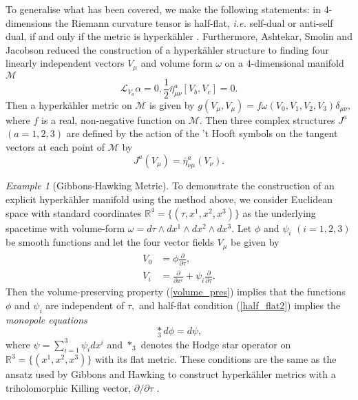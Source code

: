 \documentclass[a4paper,onecolumn,12pt]{article}
\theoremstyle{definition}
\theoremstyle{remark}
\newtheorem{ex}[thm]{Example}
\newcommand{\ie}{\emph{i.e.} }
\newcommand{\al}{\alpha}
\newcommand{\w}{\omega}
\newcommand{\m}{\mu}
\newcommand{\n}{\nu}
\newcommand{\ddt}[1]{\frac{\partial #1}{\partial \tau}}
\newcommand{\dd}[2]{\frac{\partial #1}{\partial #2}}
\newcommand{\HK}{hyperk\"ahler }
\newcommand{\x}[1]{x^{#1}}
\newcommand{\R}{\mathbb{R}}
\newcommand{\hooft}[3]{\bar{\eta}^{#1}_{#2 #3}}
\newcommand{\vol}{\w=d\tau\wedge dx^{1}\wedge dx^{2}\wedge dx^{3}}
\begin{document}
To generalise what has been covered, we make the following statements: in 4-dimensions the Riemann curvature tensor is half-flat, \ie self-dual or anti-self dual, if and only if the metric is \HK \cite{robinson_1988}. Furthermore, Ashtekar, Smolin and Jacobson reduced the construction of a \HK structure to finding four linearly independent vectors $V_{\m}$ and volume form $\w$ on a 4-dimensional manifold $\mathcal{M}$ \cite{ashtekar_1987,ashtekar_1988}
\begin{subequations}
	\begin{equation}
		\label{volume_pres}
		\mathcal{L}_{V_{a}}\al = 0,
	\end{equation}
	\begin{equation}
		\label{half_flat2}
		\frac{1}{2}\hooft{a}{\m}{\n}[V_{b},V_{c}] = 0.
	\end{equation}
\end{subequations}
Then a \HK metric on $\mathcal{M}$ is given by $g(V_{\m},V_{\m})=f\w(V_{0},V_{1},V_{2},V_{3})\delta_{\m\n},$ where $f$ is a real, non-negative function on $\mathcal{M}.$ Then three complex structures $J^{a}$ $(a=1,2,3)$ are defined by the action of the 't Hooft symbols on the tangent vectors at each point of $\mathcal{M}$ by
\begin{equation}
	J^{a}(V_{\m}) = \hooft{a}{\n}{\m}(V_{\n}).
\end{equation}
\begin{ex}[Gibbons-Hawking Metric]
	To demonstrate the construction of an explicit \HK manifold using the method above, we consider Euclidean space with standard coordinates $\R^{4} = \{(\tau,\x{1},\x{2},\x{3})\}$ as the underlying spacetime with volume-form $\vol$. Let $\phi$ and $\psi_{i}$ $(i=1,2,3)$ be smooth functions and let the four vector fields $V_{\mu}$ be given by
	\begin{subequations}
		\begin{align}
			V_{0} &= \phi\ddt{},\\
			V_{i} &= \dd{}{\x{i}} + \psi_{i}\ddt{}.
		\end{align}
	\end{subequations}
	Then the volume-preserving property (\ref{volume_pres}) implies that the functions $\phi$ and $\psi_{i}$ are independent of $\tau,$ and half-flat condition (\ref{half_flat2}) implies the \emph{monopole equations}
	\begin{equation}
		\underset{3}{\ast} d\phi = d\psi,
	\end{equation}
	where $\psi = \sum_{i=1}^{3}\psi_{i}d\x{i}$ and $\ast_{3}$ denotes the Hodge star operator on $\R^{3} = \{(\x{1},\x{2},\x{3})\}$ with its flat metric. These conditions are the same as the ansatz used by Gibbons and Hawking to construct \HK metrics with a triholomorphic Killing vector, $\partial/\partial\tau$ \cite{gibbons_1978}.
\end{ex}
\end{document}
